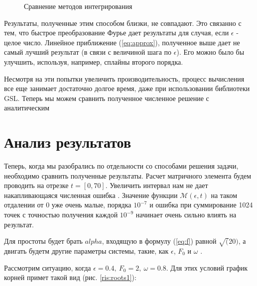 \documentclass[%
bachelor,    %
natbib,      %
subf,        %
href,        %
colorlinks,  %
]{disser}
\newcommand{\sectionbreak}{\clearpage}
\newcommand{\cM}{\mathcal{M}}
\begin{document}
\begin{figure}[h]
	\caption{Сравнение методов интегрирования}
	\label{ris:fftw_compare_no_fftw2}
\end{figure}

Результаты, полученные этим способом близки, не совпадают. Это связанно с тем, что быстрое преобразование Фурье дает результаты для случая, если $\epsilon$ - целое число. Линейное приближение (\ref{eq:approx}), полученное выше дает не самый лучший результат (в связи с величиной шага по $\epsilon$). Его можно было бы улучшить, используя, например, сплайны второго порядка.

Несмотря на эти попытки увеличить производительность, процесс вычисления все еще занимает достаточно долгое время, даже при использовании библиотеки GSL.
Теперь мы можем сравнить полученное численное решение с аналитическим

\sectionbreak
\section{Анализ результатов}
Теперь, когда мы разобрались по отдельности со способами решения задачи, необходимо сравнить полученные результаты.
Расчет матричного элемента будем проводить на отрезке $t = [0, 70]$. Увеличить интервал нам не дает накапливающаяся численная ошибка . Значение функции $\cM(\epsilon, t)$ на таком отдалении от 0 уже очень малые, порядка $10^{-7}$ и ошибка при суммирование 1024 точек с точностью получения каждой $10^{-9}$ начинает очень сильно влиять на результат.

Для простоты будет брать $alpha$, входящую в формулу (\ref{eq:f}) равной $\sqrt(20)$, а двигать будетм другие параметры системы, такие, как $\epsilon$, $F_0$ и $\omega$ .

Рассмотрим ситуацию, когда $\epsilon = 0.4,\ F_0 = 2,\ \omega = 0.8$. Для этих условий график корней примет такой вид (рис. \ref{ris:roots1}):
\end{document}
